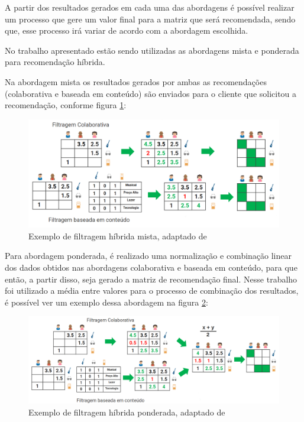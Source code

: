 A partir dos resultados gerados em cada uma das abordagens é possível realizar um processo que gere um valor final para a matriz que será recomendada, sendo que, esse processo irá variar de acordo com a abordagem escolhida. 

No trabalho apresentado estão sendo utilizadas as abordagens mista e ponderada para recomendação híbrida.

Na abordagem mista os resultados gerados por ambas as recomendações (colaborativa e baseada em conteúdo) são enviados para o cliente que solicitou a recomendação, conforme figura \ref{fig:algoritmohibridomisto}:

\begin{figure}[H]
	\centering
	\includegraphics[width=1\linewidth]{imagens/hibridamista.png}
	\caption[Exemplo de filtragem híbrida mista]{Exemplo de filtragem híbrida mista, adaptado de \cite{araujo2011apprecommender}}
    \label{fig:algoritmohibridomisto}
\end{figure}

Para abordagem ponderada, é realizado uma normalização e combinação linear dos dados obtidos nas abordagens colaborativa e baseada em conteúdo, para que então, a partir disso, seja gerado a matriz de recomendação final. Nesse trabalho foi utilizado a média entre valores para o processo de combinação dos resultados, é possível ver um exemplo dessa abordagem na figura \ref{fig:algoritmohibridoponderado}:

\begin{figure}[H]
	\centering
	\includegraphics[width=.8\linewidth]{imagens/hibridaponderada.png}
	\caption[Exemplo de filtragem híbrida ponderada]{Exemplo de filtragem híbrida ponderada, adaptado de \cite{araujo2011apprecommender}}
    \label{fig:algoritmohibridoponderado}
\end{figure}